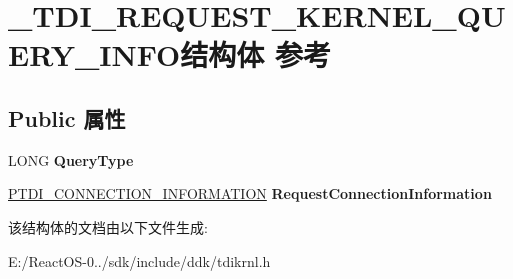 \hypertarget{struct___t_d_i___r_e_q_u_e_s_t___k_e_r_n_e_l___q_u_e_r_y___i_n_f_o}{}\section{\+\_\+\+T\+D\+I\+\_\+\+R\+E\+Q\+U\+E\+S\+T\+\_\+\+K\+E\+R\+N\+E\+L\+\_\+\+Q\+U\+E\+R\+Y\+\_\+\+I\+N\+F\+O结构体 参考}
\label{struct___t_d_i___r_e_q_u_e_s_t___k_e_r_n_e_l___q_u_e_r_y___i_n_f_o}
\subsection*{Public 属性}
\begin{DoxyCompactItemize}
\item 
\mbox{\label{struct___t_d_i___r_e_q_u_e_s_t___k_e_r_n_e_l___q_u_e_r_y___i_n_f_o_a9bfa8d546be96be1ca063f2637920fd9}} 
L\+O\+NG {\bfseries Query\+Type}
\item 
\mbox{\label{struct___t_d_i___r_e_q_u_e_s_t___k_e_r_n_e_l___q_u_e_r_y___i_n_f_o_a8882e1b956dda3f9b252e30cbc96d4d8}} 
\hyperlink{struct___t_d_i___c_o_n_n_e_c_t_i_o_n___i_n_f_o_r_m_a_t_i_o_n}{P\+T\+D\+I\+\_\+\+C\+O\+N\+N\+E\+C\+T\+I\+O\+N\+\_\+\+I\+N\+F\+O\+R\+M\+A\+T\+I\+ON} {\bfseries Request\+Connection\+Information}
\end{DoxyCompactItemize}


该结构体的文档由以下文件生成\+:\begin{DoxyCompactItemize}
\item 
E\+:/\+React\+O\+S-\/0../sdk/include/ddk/tdikrnl.\+h\end{DoxyCompactItemize}
